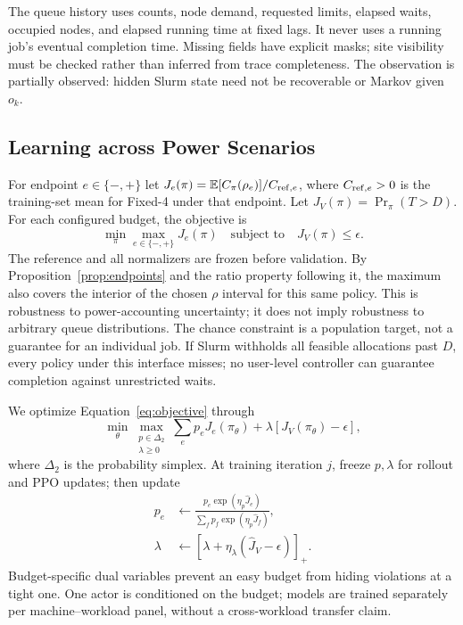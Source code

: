 The queue history uses counts, node demand, requested limits, elapsed waits,
occupied nodes, and elapsed running time at fixed lags. It never uses a running
job's eventual completion time. Missing fields have explicit masks; site
visibility must be checked rather than inferred from trace completeness.
The observation is partially observed: hidden Slurm state need not be
recoverable or Markov given $o_k$.

\subsection{Learning across Power Scenarios}
For endpoint $e\in\{-,+\}$ let
$J_e(\pi)=\mathbb E[C_\pi(\rho_e)]/C_{{\rm ref},e}$, where
$C_{{\rm ref},e}>0$ is the training-set mean for Fixed-4 under that endpoint.
Let $J_V(\pi)=\Pr_\pi(T>D)$. For each configured budget, the objective is
\begin{equation}
 \min_\pi\max_{e\in\{-,+\}}J_e(\pi)
       \quad\text{subject to}\quad J_V(\pi)\leq\epsilon .
 \label{eq:objective}
\end{equation}
The reference and all normalizers are frozen before validation. By
Proposition~\ref{prop:endpoints} and the ratio property following it, the maximum
also covers the interior of the chosen $\rho$ interval for this same policy.
This is robustness to power-accounting uncertainty; it does not imply
robustness to arbitrary queue distributions. The chance constraint is a
population target, not a guarantee for an individual job. If Slurm withholds
all feasible allocations past $D$, every policy under this interface misses;
no user-level controller can guarantee completion against unrestricted waits.

We optimize Equation~\ref{eq:objective} through
\begin{equation}
 \min_\theta\max_{\substack{p\in\Delta_2\\\lambda\geq0}}
       \sum_e p_eJ_e(\pi_\theta)
                    +\lambda[J_V(\pi_\theta)-\epsilon],
 \label{eq:lagrangian}
\end{equation}
where $\Delta_2$ is the probability simplex. At training iteration $j$,
freeze $p,\lambda$ for rollout and PPO updates; then update
\begin{align}
 p_e&\leftarrow
   \frac{p_e\exp(\eta_p\widehat J_e)}
        {\sum_f p_f\exp(\eta_p\widehat J_f)},\nonumber\\
 \lambda&\leftarrow
       [\lambda+\eta_\lambda(\widehat J_V-\epsilon)]_+ .
 \label{eq:dual}
\end{align}
Budget-specific dual variables prevent an easy budget from hiding violations
at a tight one. One actor is conditioned on the budget; models are trained
separately per machine--workload panel, without a cross-workload transfer claim.

